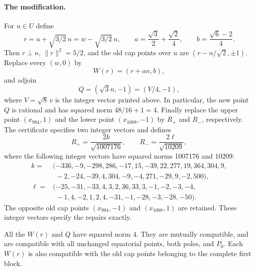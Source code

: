 \paragraph{The modification.}
For $u\in U$ define
\[
r=u+\sqrt{3/2}\,n=w-\sqrt{3/2}\,n,\qquad
a=\frac{\sqrt3}{2}+\frac{\sqrt2}{4},\qquad
b=\frac{\sqrt6-2}{4}.
\]
Then $r\perp n$, $\|r\|^2=5/2$, and the old cap points over $u$ are
$(r-n/\sqrt2,\pm1)$. Replace every $(w,0)$ by
\[
 W(r)=(r+a n,b),
\]
and adjoin
\[
 Q=(\sqrt3 n,-1)=(V/4,-1),
\]
where $V=\sqrt8\,v$ is the integer vector printed above. In particular,
the new point $Q$ is rational and has squared norm $48/16+1=4$.
Finally replace the upper point $(x_{984},1)$ and the lower point
$(x_{1008},-1)$ by $R_+$ and $R_-$, respectively. The certificate specifies
two integer vectors and defines
\[
 R_+=\frac{2k}{\sqrt{1007176}},\qquad
 R_-=\frac{2\ell}{\sqrt{10209}},
\]
where the following integer vectors have squared norms 1007176 and 10209:
\begin{align*}
k={}&(-336,-9,-298,286,-17,15,-39,22,277,19,364,304,9,\!\\
 &\phantom{(}-2,-24,-39,4,304,-9,-4,271,-29,9,-2,500),\\
\ell={}&(-25,-31,-33,4,3,2,36,33,3,-1,-2,-3,-4,\!\\
 &\phantom{(}-1,4,-2,1,2,4,-31,-1,-28,-3,-28,-50).
\end{align*}
The opposite old cap points $(x_{984},-1)$ and $(x_{1008},1)$ are retained.
These integer vectors specify the repairs exactly.

\begin{lemma}
All the $W(r)$ and $Q$ have squared norm 4. They are mutually compatible,
and are compatible with all unchanged equatorial points, both poles, and
$P_0$. Each $W(r)$ is also compatible with the old cap points belonging
to the complete first block.
\end{lemma}

